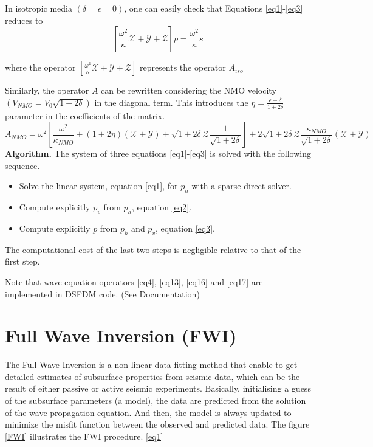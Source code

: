 In isotropic media $(\delta = \epsilon = 0)$, one can easily check that Equations \ref{eq1}-\ref{eq3} reduces to
\begin{equation}
\left[ \frac{\omega^{2}}{\kappa} \mathcal{X} + \mathcal{Y} + \mathcal{Z} \right] p=\frac{\omega^{2}}{\kappa} s \label{eq16}
\end{equation}

where the operator $\left[ \frac{\omega^{2}}{\kappa} \mathcal{X} + \mathcal{Y} + \mathcal{Z} \right]$ represents the operator $A_{iso}$

Similarly, the operator $A$ can be rewritten considering the NMO velocity $(V_{NMO} = V_0\sqrt{1+2\delta} )$ in the diagonal term. This introduces the $\eta = \frac{\epsilon -\delta}{1+2\delta}$ parameter in the coefficients of the matrix.
\begin{equation}
A_{NMO} = \omega^{2} \left[ \frac{\omega^{2}}{\kappa_{NMO}} + (1+2 \eta) (\mathcal{X} + \mathcal{Y}) + \sqrt{1+2\delta} \mathcal{Z} \frac{1}{\sqrt{1+2\delta}} \right]+ 2 \sqrt{1+2\delta} \mathcal{Z} \frac{\kappa_{NMO}}{\sqrt{1+2\delta}} (\mathcal{X} + \mathcal{Y})\label{eq17}
\end{equation}
\textbf{Algorithm.} \newline
The system of three equations \ref{eq1}-\ref{eq3} is solved with the following sequence.
\begin{itemize}
\item Solve the linear system, equation \ref{eq1}, for $p_h$ with a sparse direct solver.
\item Compute explicitly $p_v$ from $p_h$, equation \ref{eq2}.
\item Compute explicitly $p$ from $p_h$ and $p_v$, equation \ref{eq3}.
\end{itemize}
The computational cost of the last two steps is negligible relative to that of the first step.

Note that wave-equation operators \ref{eq4}, \ref{eq13}, \ref{eq16} and \ref{eq17} are implemented in DSFDM code. (See Documentation)

\section{Full Wave Inversion (FWI)}
The Full Wave Inversion is a non linear-data fitting method that enable to get detailed estimates of subsurface properties from seismic data, which can be the result of either passive or active seismic experiments. Basically, initialising a guess of the subsurface parameters (a model), the data are predicted from the solution of the wave propagation equation. And then, the model is always updated to minimize the misfit function between the observed and predicted data. The figure \ref{FWI} illustrates the FWI procedure. \eqref{eq1}

